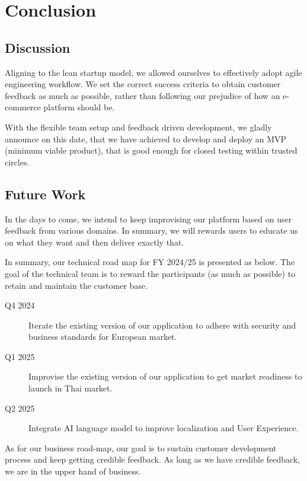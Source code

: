 %
%
\chapter{Conclusion}

\section{Discussion}

Aligning to the lean startup model, we allowed ourselves to effectively adopt agile engineering workflow. We set the correct success criteria to obtain customer feedback as much as possible, rather than following our prejudice of how an e-commerce platform should be.

With the flexible team setup and feedback driven development, we gladly announce on this date, that we have achieved to develop and deploy an MVP (minimum viable product), that is good enough for closed testing within trusted circles.

\section{Future Work}

In the days to come, we intend to keep improvising our platform based on user feedback from various domains. In summary, we will rewards users to educate us on what they want and then deliver exactly that.

In summary, our technical road map for FY 2024/25 is presented as below. The goal of the technical team is to reward the participants (as much as possible) to retain and maintain the customer base.

\begin{description}
	\item[Q4 2024] Iterate the existing version of our application to adhere with security and business standards for European market.
	\item[Q1 2025] Improvise the existing version of our application to get market readiness to launch in Thai market.
	\item[Q2 2025] Integrate AI language model to improve localization and User Experience.
\end{description}

As for our business road-map, our goal is to sustain customer development process and keep getting credible feedback. As long as we have credible feedback, we are in the upper hand of business.

